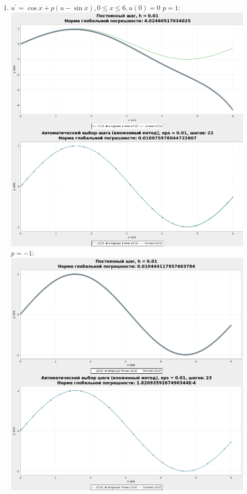 \documentclass[a4paper,12pt]{article}
\begin{document}
\begin{flushleft}
\begin{enumerate}
    \item
      \(u^{'}=\cos{x}+p(u-\sin{x}), 0 \le x \le 6, u(0) = 0\)\linebreak\linebreak
      $p = 1:$\linebreak\linebreak\includegraphics{sc1.png}\linebreak\linebreak
      $p = -1:$\linebreak\linebreak\includegraphics{scm1.png}\linebreak\linebreak

\end{enumerate}
\end{flushleft}
\end{document}
